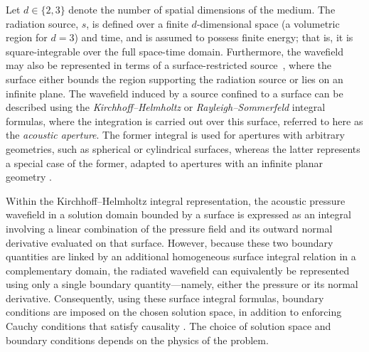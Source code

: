 \documentclass[11pt,reqno]{amsart}
\theoremstyle{remark}
\theoremstyle{italic_lemma}
\begin{document}

 

Let $d \in \{2,3\}$ denote the number of spatial dimensions of the medium. The radiation source, $s$, is defined over a finite $d$-dimensional space (a volumetric region for $d=3$) and time, and is assumed to possess finite energy; that is, it is square-integrable over the full space-time domain. Furthermore, the wavefield may also be represented in terms of a surface-restricted source~\cite{Wu1}, where the surface either bounds the region supporting the radiation source or lies on an infinite plane. The wavefield induced by a source confined to a surface can be described using the \textit{Kirchhoff--Helmholtz} or \textit{Rayleigh--Sommerfeld} integral formulas, where the integration is carried out over this surface, referred to here as the \textit{acoustic aperture}. The former integral is used for apertures with arbitrary geometries, such as spherical or cylindrical surfaces, whereas the latter represents a special case of the former, adapted to apertures with an infinite planar geometry \cite{Devaney}.

Within the Kirchhoff–Helmholtz integral representation, the acoustic pressure wavefield in a solution domain bounded by a surface is expressed as an integral involving a linear combination of the pressure field and its outward normal derivative evaluated on that surface. However, because these two boundary quantities are linked by an additional homogeneous surface integral relation in a complementary domain, the radiated wavefield can equivalently be represented using only a single boundary quantity—namely, either the pressure or its normal derivative. Consequently, using these surface integral formulas, boundary conditions are imposed on the chosen solution space, in addition to enforcing Cauchy conditions that satisfy causality \cite{Devaney}. The choice of solution space and boundary conditions depends on the physics of the problem.
\end{document}
